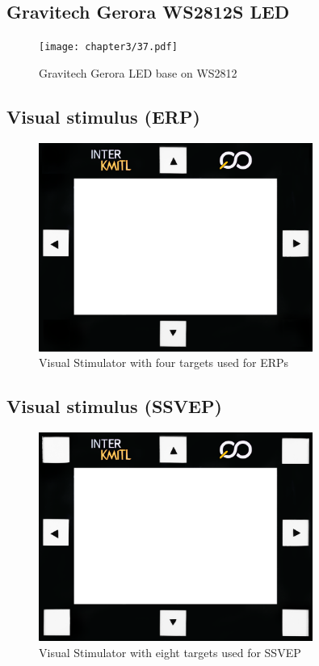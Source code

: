 \subsection{Gravitech Gerora WS2812S LED}
\begin{figure}[ht]
	\centering
	\texttt{[image: chapter3/37.pdf]}
	\caption{Gravitech Gerora LED base on WS2812}
\end{figure}

\subsection{Visual stimulus (ERP)}
\begin{figure}[ht]
	\centering
	\includegraphics[width=0.8\textwidth]{chapter7/frame_4.jpg}
	\caption{Visual Stimulator with four targets used for ERPs}
\end{figure}

\subsection{Visual stimulus (SSVEP)}
\begin{figure}[ht]
	\centering
	\includegraphics[width=0.8\textwidth]{chapter7/frame_8.jpg}
	\caption{Visual Stimulator with eight targets used for SSVEP}
\end{figure}

